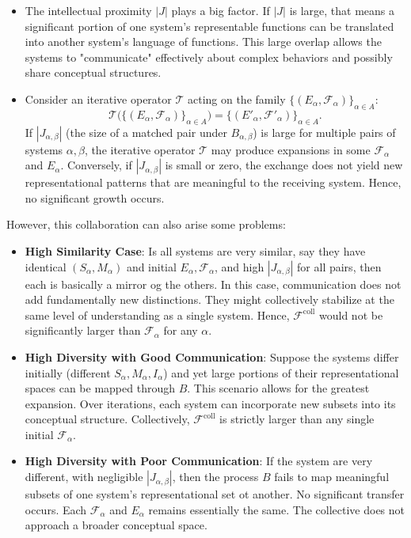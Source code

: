 \documentclass[]{article}
\begin{document}
\begin{itemize}
	\item The intellectual proximity $|J|$ plays a big factor. If $|J|$ is large, that means a significant portion of one system’s representable functions can be translated into another system’s language of functions. This large overlap allows the systems to "communicate" effectively about complex behaviors and possibly share conceptual structures.
	
	\item Consider an iterative operator $\mathcal{T}$ acting on the family $\{( E_\alpha, \mathcal{F}_\alpha )\}_{\alpha \in A}$:
	\[  \mathcal{T} \Big( \{( E_\alpha, \mathcal{F}_\alpha )\}_{\alpha \in A} \Big) = \{( E'_\alpha, \mathcal{F}'_\alpha )\}_{\alpha \in A}. \]
	If $|J_{\alpha,\beta}|$ (the size of a matched pair under $B_{\alpha,\beta}$) is large for multiple pairs of systems $\alpha, \beta$, the iterative operator $\mathcal{T}$ may produce expansions in some $\mathcal{F}_\alpha$ and $E_\alpha$. Conversely, if $|J_{\alpha,\beta}|$ is small or zero, the exchange does not yield new representational patterns that are meaningful to the receiving system. Hence, no significant growth occurs.
\end{itemize}

However, this collaboration can also arise some problems:
\begin{itemize}
	\item \textbf{High Similarity Case}: Is all systems are very similar, say they have identical $(S_\alpha, M_\alpha)$ and initial $E_\alpha, \mathcal{F}_\alpha$, and high $|J_{\alpha, \beta}|$ for all pairs, then each is basically a mirror og the others. In this case, communication does not add fundamentally new distinctions. They might collectively stabilize at the same level of understanding as a single system. Hence, $\mathcal{F}^{\text{coll}}$ would not be significantly larger than $\mathcal{F}_\alpha$ for any $\alpha$.
	\item \textbf{High Diversity with Good Communication}: Suppose the systems differ initially (different $S_\alpha, M_\alpha, I_\alpha$) and yet large portions of their representational spaces can be mapped through $B$. This scenario allows for the greatest expansion. Over iterations, each system can incorporate new subsets into its conceptual structure. Collectively, $\mathcal{F}^\text{coll}$ is strictly larger than any single initial $\mathcal{F}_\alpha$.
	\item \textbf{High Diversity with Poor Communication}: If the system are very different, with negligible $|J_{\alpha,\beta}|$, then the process $B$ fails to map meaningful subsets of one system's representational set ot another. No significant transfer occurs. Each $\mathcal{F}_\alpha$ and $E_\alpha$ remains essentially the same. The collective does not approach a broader conceptual space.
\end{itemize}
\end{document}
